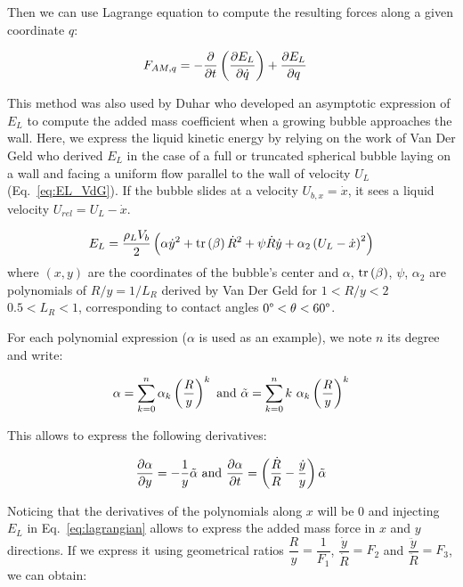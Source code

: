 Then we can use Lagrange equation to compute the resulting forces along a given coordinate $q$:


\begin{align}
F_{AM,q}&=-\frac{\partial }{\partial t}\left( \frac{\partial E_{L}}{\partial \dot{q}} \right)+\frac{\partial E_{L}}{\partial q}
\label{eq:lagrangian}
\end{align}


This method was also used by Duhar \cite{duhar_dynamics_2006} who developed an asymptotic expression of $E_{L}$ to compute the added mass coefficient when a growing bubble approaches the wall. Here, we express the liquid kinetic energy by relying on the work of Van Der Geld \cite{van_der_geld_dynamics_2009} who derived $E_{L}$ in the case of a full or truncated spherical bubble laying on a wall and facing a uniform flow parallel to the wall of velocity $U_{L}$ (Eq.~\ref{eq:EL_VdG}). If the bubble slides at a velocity $U_{b,x}=\dot{x}$, it sees a liquid velocity $U_{rel}=U_{L}-\dot{x}$.

\begin{align}
E_{L}=\frac{\rho_{L}V_{b}}{2}\left( \alpha \dot{y}^{2} +\mathrm{tr}\left( \beta \right)\dot{R}^{2}+\psi \dot{R}\dot{y} +\alpha_{2} \left( U_{L}-\dot{x} \right)^{2}  \right)
\label{eq:EL_VdG}
\end{align}
where $(x,y)$ are the coordinates of the bubble's center and $\alpha$, $\mathrm{tr}\left( \beta \right)$, $\psi$, $\alpha_{2}$ are polynomials of $R/y = 1/L_{R}$ derived by Van Der Geld for $1<R/y<2$ \ie $0.5<L_{R}<1$, corresponding to contact angles $0\degree < \theta < 60\degree$.

\npar
For each polynomial expression ($\alpha$ is used as an example), we note $n$ its degree and write:

\begin{equation}
\alpha = \sum_{k=0}^{n}\alpha_{k}\parth{\frac{R}{y} }^{k}\ \text{and}\ \tilde{\alpha}= \sum_{k=0}^{n}k\ \alpha_{k}\parth{\frac{R}{y} }^{k}
\end{equation}

This allows to express the following derivatives:

\begin{equation}
\frac{\partial \alpha}{\partial y} = -\frac{1}{y} \tilde{\alpha}\ \text{and}\ \frac{\partial \alpha}{\partial t} = \left( \frac{\dot{R}}{R} - \frac{\dot{y}}{y} \right) \tilde{\alpha}
\end{equation}


Noticing that the derivatives of the polynomials along $x$ will be 0 and injecting $E_{L}$ in Eq.~\ref{eq:lagrangian} allows to express the added mass force in $x$ and $y$ directions. If we express it using geometrical ratios $\dfrac{R}{y}=\dfrac{1}{F_{1}}$, $\dfrac{\dot{y}}{\dot{R}}=F_{2}$ and $\dfrac{\ddot{y}}{\ddot{R}}=F_{3}$, we can obtain:

